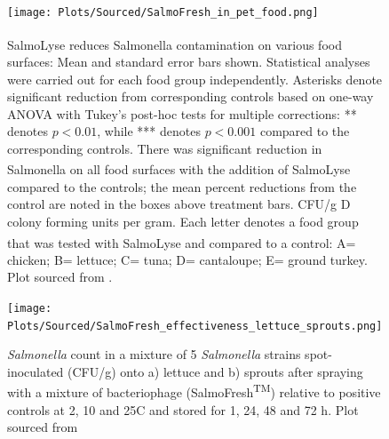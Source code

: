 \begin{figure}[ht!]
    \centering
    \texttt{[image: Plots/Sourced/SalmoFresh\_in\_pet\_food.png]}
    \caption{SalmoLyse\textsuperscript{\textregistered} reduces Salmonella contamination on various food surfaces: Mean and standard error bars shown.
        Statistical analyses were carried out for each food group independently.
        Asterisks denote significant reduction from corresponding controls based on one-way ANOVA with Tukey's post-hoc tests for multiple corrections: ** denotes $p < 0.01$, while *** denotes $p < 0.001$ compared to the corresponding controls.
        There was significant reduction in Salmonella on all food surfaces with the addition of SalmoLyse\textsuperscript{\textregistered} compared to the controls; the mean percent reductions from the control are noted in the boxes above treatment bars.
        CFU/g D colony forming units per gram.
        Each letter denotes a food group that was tested with SalmoLyse\textsuperscript{\textregistered} and compared to a control: A= chicken; B= lettuce; C= tuna; D= cantaloupe; E= ground turkey. Plot sourced from \citet{sofferBacteriophagesSafelyReduce2016}. 
    }
    \label{fig:SalmoFresh_in_pet_food}
\end{figure}

\begin{figure}[ht!]
    \centering
    \texttt{[image: Plots/Sourced/SalmoFresh\_effectiveness\_lettuce\_sprouts.png]}
    \caption{\textit{Salmonella} count in a mixture of 5 \textit{Salmonella} strains spot-inoculated (CFU/g) onto a) lettuce and b) sprouts after spraying with a mixture of bacteriophage (SalmoFresh\textsuperscript{TM}) relative to positive controls at 2, 10 and 25C and stored for 1, 24, 48 and 72 h. Plot sourced from \citet{zhangSalmoFreshEffectivenessControlling2019}}
    \label{fig:SalmoFresh_effectiveness_lettuce_sprouts}
\end{figure}


